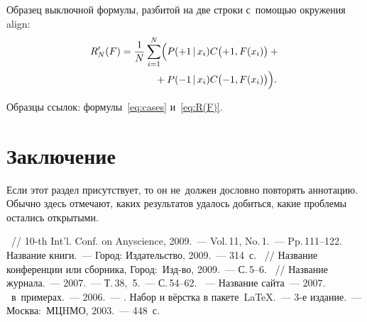 \documentclass[10pt]{article}
\begin{document}
Образец выключной формулы, разбитой на две строки с~помощью окружения align:
\begin{align}
    R'_N(F)
        = \frac1N \sum_{i=1}^N
        \Bigl(
            & P(+1\cond x_i) C\bigl(+1,F(x_i)\bigr)+{}
        \notag %
    \\ {}+{}
            & P(-1\cond x_i) C\bigl(-1,F(x_i)\bigr)
        \Bigr).
        \label{eq:R(F)}
\end{align}

Образцы ссылок: формулы~\eqref{eq:cases} и~\eqref{eq:R(F)}.

\section*{Заключение}
Если этот раздел присутствует, то он не~должен дословно повторять аннотацию.
Обычно здесь отмечают,
каких результатов удалось добиться,
какие проблемы остались открытыми.

\begin{thebibliography}{1}
    ~//
    10-th Int'l. Conf. on Anyscience, 2009.~--- Vol.\,11, No.\,1.~--- Pp.\,111--122.
    Название книги.~---
    Город: Издательство, 2009.~--- 314~с.
    ~//
    Название конференции или сборника,
    Город:~Изд-во, 2009.~--- С.\,5--6.
    ~//
    Название журнала.~--- 2007.~--- Т.\,38, \No\,5.~--- С.\,54--62.
    ~---
    Название сайта~--- 2007.
    \LaTeXe\ в~примерах.~---
    2006.~---
    .
     Набор и вёрстка в пакете~\LaTeX.~---
    3-е издание.~---
    Москва:~МЦHМО, 2003.~--- 448~с.
\end{thebibliography}
\end{document}
